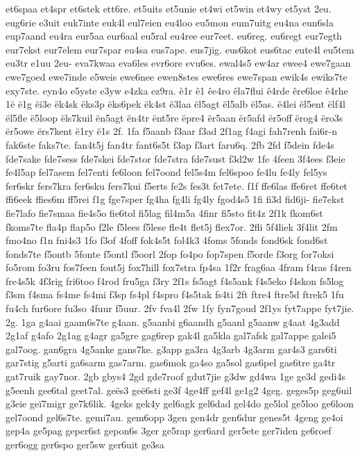 {et6spaa
et4spr
et6stek
ett6re.
et5uits
et5unie
et4wi
et5win
et4wy
et5yst
2eu.
eug6rie
e3uit
euk7inte
euk4l
eul7eien
eu4loo
eu5mon
eum7uitg
eu4na
eun6sla
eup7aand
eu4ra
eur5aa
eur6aal
eu5ral
eu4ree
eur7eet.
eu6reg.
eu6regt
eur7egth
eur7ekst
eur7elem
eur7spar
eu4sa
eus7ape.
eus7jig.
eus6kot
eus6tac
eute4l
eu5tem
eu3tr
e1uu
2eu-
eva7kwaa
eva6les
evr6ore
evu6es.
ewal4s5
ew4ar
ewee4
ewe7gaan
ewe7goed
ewe7inde
e5weis
ewe6nee
ewen8stes
ewe6res
ewe7span
ewik4s
ewiks7te
exy7ste.
eyn4o
e5yste
e3yw
e4zka
ez9ra.
è1r
ê1
êe4ro
êla7flui
ê4rde
êre6loe
ê4rhe
1ë
ë1g
ëi3e
ëk4sk
ëks3p
ëks6pek
ëk4st
ë3laa
ël5agt
ël5alb
ël5as.
ë4lei
ël5ent
ëlf4l
ël5fle
ë5loop
ëls7kuil
ën5agt
ën4tr
ënt5re
ëpre4
ër5aan
ër5afd
ër5off
ërog4
ëro3s
ër5owe
ërs7kent
ë1ry
ë1s
2f.
1fa
f5aanb
f3aar
f3ad
2f1ag
f4agi
fah7renh
fai6r-n
fak6ste
faks7te.
fan4t5j
fan4tr
fant6s5t
f3ap
f3art
faru6q.
2fb
2fd
f5dein
fde4s
fde7sake
fde7sess
fde7skei
fde7stor
fde7stra
fde7sust
f3d2w
1fe
4feen
3f4ees
f3eie
fe4l5ap
fel7asem
fel7enti
fe6loon
fel7oond
fel5s4m
fel6spoo
fe4lu
fe4ly
fel5ys
fer6skr
fers7kra
fer6sku
fers7kui
f5erts
fe2s
fes3t
fet7ete.
f1f
ffe6las
ffe6ret
ffe6tet
ffi6eek
ffies6m
ff5rei
f1g
fge7sper
fg4ha
fg4li
fg4ly
fgod4s5
1fi
fi3d
fid6ji-
fie7ekst
fie7lafo
fie7smaa
fie4s5o
fie6tol
fi5lag
fil4m5a
4finr
fi5sto
fit4z
2f1k
fkom6st
fkoms7te
fla4p
flap5o
f2le
f5lees
f5lese
fle4t
flet5j
flex7or.
2fli
5f4liek
3f4lit
2fm
fmo4no
f1n
fni4s3
1fo
f3of
4foff
fok4s5t
fol4k3
4foms
5fonds
fond6sk
fond6st
fonds7te
f5ontb
5fonte
f5ontl
f5oorl
2fop
fo4po
fop7spen
f5orde
f3org
for7oksi
fo5rom
fo3ru
fos7feen
fout5j
fox7hill
fox7stra
fp4sa
1f2r
frag6aa
4fram
f4ras
f4ren
fre4s5k
4f3rig
fri6too
f4rod
fru5ga
f3ry
2f1s
fs5agt
f4s5ank
f4s5eko
f4skon
fs5log
f3sm
f4sma
fs4me
fs4mi
f3sp
fs4pl
f4spro
f4s5tak
fs4ti
2ft
ftre4
ftre5d
ftrek5
1fu
fu4ch
fur6ore
fu3so
4fuur
f5uur.
2fv
fva4l
2fw
1fy
fyn7goud
2f1ys
fyt7appe
fyt7jie.
2g.
1ga
g4aai
gaam6s7te
g4aan.
g5aanbi
g6aandh
g5aanl
g5aanw
g4aat
4g3add
2g1af
g4afo
2g1ag
g4agr
ga5gre
gag6rep
gak4l
ga5kla
gal7afsk
gal7appe
galei5
gal7oog.
gan6gra
4g5anke
gans7ke.
g3app
ga3ra
4g3arb
4g3arm
gar4s3
gars6ti
gar7stig
g5arti
ga6sarm
gas7arm.
gas6mok
ga4so
ga5sol
gas6pel
gas6tre
ga4tr
gat7ruik
gay7nor.
2gb
gbys4
2gd
gde7roof
gdut7jie
g3dw
gd4wa
1ge
ge3d
gedi4s
g5eenh
gee6tal
geet7al.
geës3
geë6sti
ge3f
4ge4ff
gef4l
ge1g2
4geg.
geges5p
geg6uil
g3eie
geï7migr
ge7k6lik.
4geks
gek4y
gel6agk
gel6dad
gel4do
ge5lol
ge5loo
ge6loon
gel7oond
gel6s7te.
gemi7au.
gem6opp
3gen
gen4dr
gen6dur
genes5t
4geng
ge4oi
gep4a
ge5pag
geper6st
gepon6s
3ger
ge5rap
ger6ard
ger5ete
ger7iden
ge6roef
ger6ogg
ger6spo
ger5sw
ger6uit
ge3sa
}
